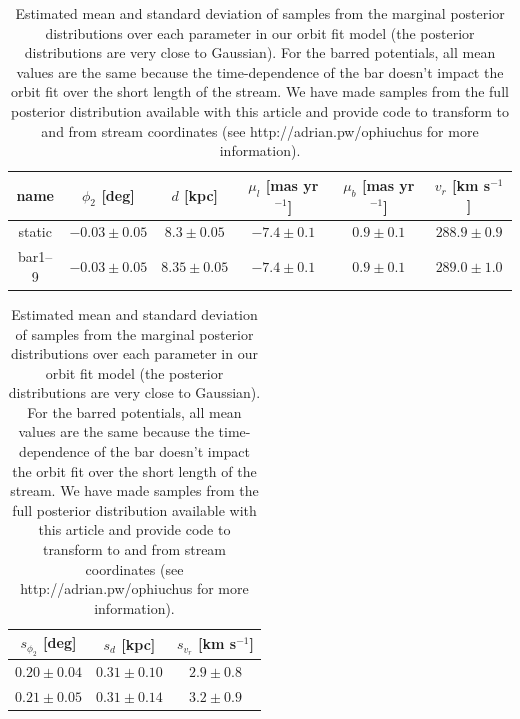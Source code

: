 \begin{table}[ht]
\footnotesize
\begin{center}
	\begin{tabular}{cccccc}
	\toprule
	name & $\phi_2$ [deg] & $d$ [kpc] & $\mu_l$ [mas yr$^{-1}$] & $\mu_b$ [mas yr$^{-1}$] & $v_r$ [km s$^{-1}$]\\\midrule
	static & $-0.03\pm0.05$ & $8.3\pm0.05$ & $-7.4\pm0.1$ & $0.9\pm0.1$ & $288.9\pm0.9$\\
	bar1--9 & $-0.03\pm0.05$ & $8.35\pm0.05$ & $-7.4\pm0.1$ & $0.9\pm0.1$ & $289.0\pm1.0$\\
	\bottomrule
	\end{tabular}

	\begin{tabular}{ccc}
	\toprule
	$s_{\phi_2}$ [deg] & $s_{d}$ [kpc] & $s_{v_r}$ [km s$^{-1}$]\\\midrule
	$0.20\pm0.04$ & $0.31\pm0.10$ & $2.9\pm0.8$\\
	$0.21\pm0.05$ & $0.31\pm0.14$ & $3.2\pm0.9$\\
	\bottomrule
	\end{tabular}
	\caption{Estimated mean and standard deviation of samples from the marginal
	posterior distributions over each parameter in our orbit fit model (the
	posterior distributions are very close to Gaussian). For the barred
	potentials, all mean values are the same because the time-dependence of the
	bar doesn't impact the orbit fit over the short length of the stream. We
	have made samples from the full posterior distribution available with this
	article and provide code to transform to and from stream coordinates (see
	http://adrian.pw/ophiuchus for more information).\label{tbl:param-means} }
\end{center}
\end{table}

